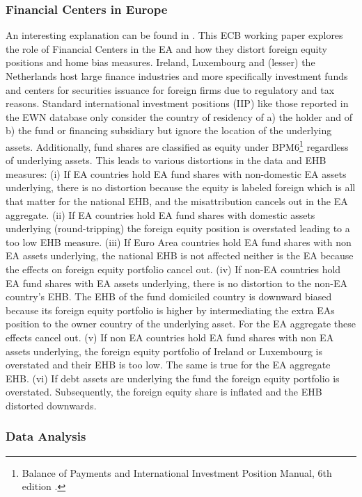 \documentclass[11pt,a4paper]{article}
\begin{document}
\subsubsection{Financial Centers in Europe}\label{subsubsec:oofc}

An interesting explanation can be found in \textcite{NBERw32275}. This ECB working paper explores the role of Financial Centers in the EA and how they distort foreign equity positions and home bias measures. 
Ireland, Luxembourg and (lesser) the Netherlands host large finance industries and more specifically investment funds and centers for securities issuance for foreign firms due to regulatory and tax reasons. 
Standard international investment positions (IIP) like those reported in the EWN database only consider the country of residency of a) the holder and of b) the fund or financing subsidiary but ignore the location of the underlying assets. 
Additionally, fund shares are classified as equity under BPM6\footnote{Balance of Payments and International Investment Position Manual, 6th edition \parencite{IMF2009BPM6}.} regardless of underlying assets. This leads to various distortions in the data and EHB measures: 
(i) If EA countries hold EA fund shares with non-domestic EA assets underlying, there is no distortion because the equity is labeled foreign which is all that matter for the national EHB, and the misattribution cancels out in the EA aggregate. (ii) If EA countries hold EA fund shares with domestic assets underlying (round-tripping) the foreign equity position is overstated leading to a too low EHB measure. (iii) If Euro Area countries hold EA fund shares with non EA assets underlying, the national EHB is not affected neither is the EA because the effects on foreign equity portfolio cancel out. (iv) If non-EA countries hold EA fund shares with EA assets underlying, there is no distortion to the non-EA country's EHB. The EHB of the fund domiciled country is downward biased because its foreign equity portfolio is higher by intermediating the extra EAs position to the owner country of the underlying asset. For the EA aggregate these effects cancel out. (v) If non EA countries hold EA fund shares with non EA assets underlying, the foreign equity portfolio of Ireland or Luxembourg is overstated and their EHB is too low. The same is true for the EA aggregate EHB. (vi) If debt assets are underlying the fund the foreign equity portfolio is overstated. Subsequently, the foreign equity share is inflated and the EHB distorted downwards.

\subsubsection{Data Analysis}
\end{document}
